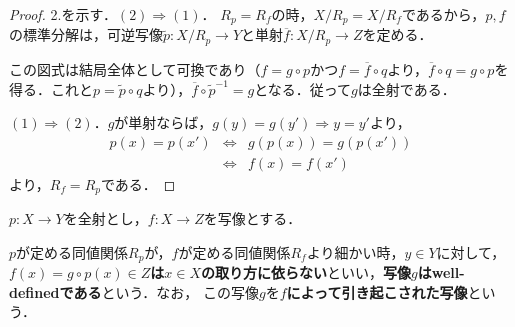 \documentclass[uplatex,dvipdfmx]{jsreport}
\begin{document}
\begin{proof}
    2.を示す．$(2)\Rightarrow(1)$． $R_p=R_f$の時，$X/R_p=X/R_f$であるから，$p,f$の標準分解は，可逆写像$\tilde{p}:X/R_p\to Y$と単射$\overline{f}:X/R_p\to Z$を定める．
    \begin{center}\end{center}
    この図式は結局全体として可換であり（$f=g\circ p$かつ$f=\overline{f}\circ q$より，$\overline{f}\circ q=g\circ p$を得る．これと$p=\tilde{p}\circ q$より），$\overline{f}\circ\tilde{p}^{-1}=g$となる．従って$g$は全射である．

    $(1)\Rightarrow(2)$．$g$が単射ならば，$g(y)=g(y')\Rightarrow y=y'$より，
    \begin{eqnarray*}
        p(x)=p(x') &\Leftrightarrow& g(p(x))=g(p(x')) \\
        &\Leftrightarrow& f(x)=f(x')
    \end{eqnarray*}
    より，$R_f=R_p$である．
\end{proof}

\begin{definition}
    $p:X\to Y$を全射とし，$f:X\to Z$を写像とする．
    \begin{center}\end{center}
    $p$が定める同値関係$R_p$が，$f$が定める同値関係$R_f$より細かい時，$y\in Y$に対して，\textbf{$f(x)=g\circ p(x)\in Z$は$x\in X$の取り方に依らない}といい，\textbf{写像$g$はwell-definedである}という．なお，
    この写像$g$を\textbf{$f$によって引き起こされた写像}という．
\end{definition}
\end{document}
